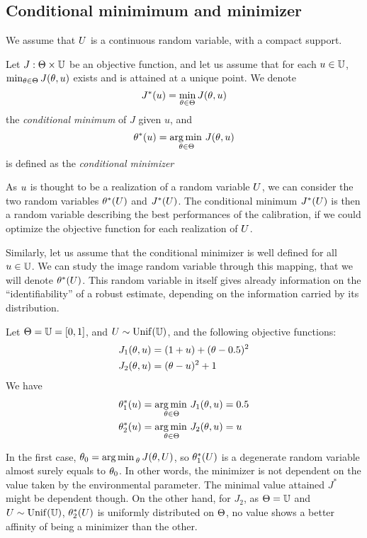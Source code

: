 \documentclass[../../Main_ManuscritThese.tex]{subfiles}
\begin{document}
\subsection{Conditional minimimum and minimizer}
\label{sec:MPE}
We assume that $U$ is a continuous random variable, with a compact
support.
\begin{definition}
  Let $J: \Theta \times \mathbb{U}$ be an objective function, and let us
  assume that for each $u \in \mathbb{U}$,
  $\min_{\theta \in \Theta} J(\theta,u)$ exists and is attained at a
  unique point.  We denote
  \begin{equation}
    J^*(u) = \min_{\theta \in \Theta} J(\theta,u)
  \end{equation}
  the \emph{conditional minimum} of $J$ given $u$, and
  \begin{equation}
    \label{eq:def_kstar}
    \theta^*(u) = \operatorname*{arg\,min \,}_{\theta\in\Theta} J(\theta, u)
  \end{equation}
 is defined as the \emph{conditional minimizer}
\end{definition}
As $u$ is thought to be a realization of a random variable $U$, we
can consider the two random variables $\theta^*(U)$ and $J^*(U)$.
The conditional minimum $J^*(U)$ is then a random variable
describing the best performances of the calibration, if we could
optimize the objective function for each realization of $U$.

Similarly, let us assume that the conditional minimizer is well
defined for all $u\in \mathbb{U}$. We can study the image random
variable through this mapping, that we will denote $\theta^*(U)$.  This
random variable in itself gives already information on the
``identifiability'' of a robust estimate, depending on the information
carried by its distribution.
\begin{example}
Let $\Theta = \mathbb{U}= [0, 1]$, and $U \sim \mathrm{Unif}(\mathbb{U})$, and the following objective functions:
\begin{align}
  J_1(\theta, u) &= (1+u)+(\theta - 0.5)^2\\
  J_2(\theta, u) &= (\theta-u)^2 + 1
\end{align}
We have
\begin{align}
  \theta^*_1(u) &= \operatorname*{arg\,min \,}_{\theta \in \Theta} J_1(\theta, u) = 0.5 \\
  \theta^*_2(u) &= \operatorname*{arg\,min \,}_{\theta\in\Theta} J_2(\theta, u) = u
\end{align}

In the first case, $\theta_0 = \operatorname*{arg\,min \,}_{\theta} J(\theta, U)$, so
$\theta_1^*(U)$ is a degenerate random variable almost surely equals to
$\theta_0$. In other words, the minimizer is not dependent on the value
taken by the environmental parameter. The minimal value attained $J^*$
might be dependent though. On the other hand, for $J_2$, as
$\Theta=\mathbb{U}$ and $U \sim \mathrm{Unif}(\mathbb{U})$,
$\theta_2^*(U)$ is uniformly distributed on $\Theta$, no value shows a
better affinity of being a minimizer than the other.
\end{example}
\end{document}
